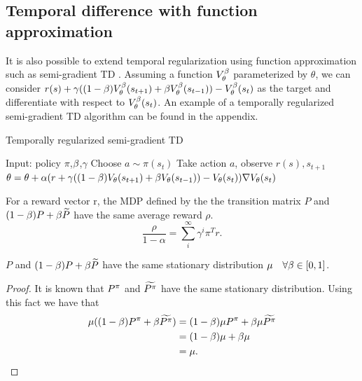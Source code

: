 \subsection{Temporal difference with function approximation}
It is also possible to extend temporal regularization using function approximation such as  semi-gradient TD \cite{sutton2017reinforcement}. 
Assuming a function $V_{\theta}^{\beta}$ parameterized by $\theta$, we can consider $r(s) + \gamma ((1-\beta)V_{\theta}^{\beta}(s_{t+1}) + \beta V_{\theta}^{\beta}(s_{t-1})) - V_{\theta}^{\beta}(s_t)$  as the target and differentiate with respect to $V_{\theta}^{\beta}(s_{t})$. An example of a temporally regularized semi-gradient TD algorithm can be found in the appendix.


\begin{algorithm}[H]
\caption{Temporally regularized semi-gradient TD}
\begin{algorithmic}[1]
    \STATE Input: policy $\pi$,$\beta$,$\gamma$
        \STATE Choose $a \sim \pi(s_t)$
        \STATE Take action $a$, observe $r(s),s_{t+1}$
        \STATE $\theta = \theta + \alpha (r + \gamma((1-\beta) V_{\theta}(s_{t+1}) + \beta V_{\theta}(s_{t-1})) - V_{\theta}(s_t))\nabla V_{\theta}(s_{t}) $
    \ENDFOR
\end{algorithmic}
\end{algorithm}

\begin{property}
For a reward vector r, the MDP defined by the the transition matrix $P$ and $(1-\beta) P + \beta \widetilde{P}$ have the same average reward $\rho$.
\begin{equation}
    \frac{\rho}{1-\alpha} = \sum_i^{\infty}\gamma^i \pi^T r.
\end{equation}
\end{property}

\begin{lemma}
$P$ and $(1-\beta) P + \beta \widetilde{P}$ have the same stationary distribution $\mu \quad \forall \beta \in [0,1]$.
\end{lemma}
\begin{proof}
It is known that $P^{\pi}$ and $\widetilde{P^{\pi}}$ have the same stationary distribution. Using this fact we have that
\begin{equation}
    \begin{split}
        \mu( (1-\beta) P^{\pi} + \beta \widetilde{P^{\pi}}) &=  (1-\beta) \mu P^{\pi} + \beta \mu \widetilde{P^{\pi}} \\
        &= (1-\beta)\mu + \beta \mu\\
        &= \mu.
    \end{split}
\end{equation}
\end{proof}

